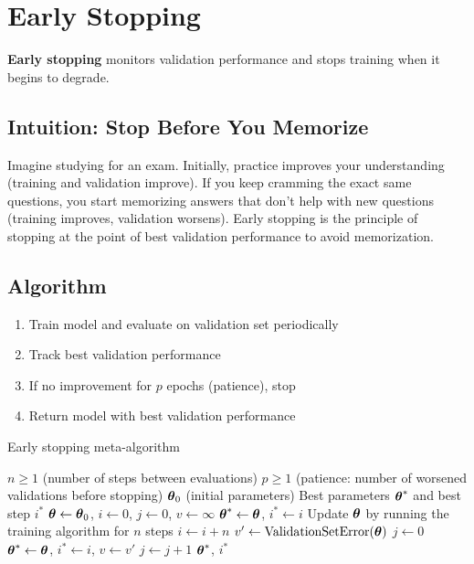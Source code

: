 
\section{Early Stopping }
\label{sec:early-stopping}

\textbf{Early stopping} monitors validation performance and stops training when it begins to degrade.

\subsection{Intuition: Stop Before You Memorize}

Imagine studying for an exam. Initially, practice improves your understanding (training and validation improve). If you keep cramming the exact same questions, you start memorizing answers that don't help with new questions (training improves, validation worsens). Early stopping is the principle of stopping at the point of best validation performance to avoid memorization.

\subsection{Algorithm}

\begin{enumerate}
    \item Train model and evaluate on validation set periodically
    \item Track best validation performance
    \item If no improvement for $p$ epochs (patience), stop
    \item Return model with best validation performance
\end{enumerate}

\begin{algorithm}
\caption{Early stopping meta-algorithm}
\label{alg:early-stopping}
\begin{algorithmic}
\Require $n \geq 1$ (number of steps between evaluations)
\Require $p \geq 1$ (patience: number of worsened validations before stopping)
\Require $\boldsymbol{\theta}_0$ (initial parameters)
\Ensure Best parameters $\boldsymbol{\theta}^*$ and best step $i^*$
\State $\boldsymbol{\theta} \gets \boldsymbol{\theta}_0$, $i \gets 0$, $j \gets 0$, $v \gets \infty$
\State $\boldsymbol{\theta}^* \gets \boldsymbol{\theta}$, $i^* \gets i$
    \State Update $\boldsymbol{\theta}$ by running the training algorithm for $n$ steps
    \State $i \gets i + n$
    \State $v' \gets \text{ValidationSetError}(\boldsymbol{\theta})$
        \State $j \gets 0$
        \State $\boldsymbol{\theta}^* \gets \boldsymbol{\theta}$, $i^* \gets i$, $v \gets v'$
    \Else
        \State $j \gets j + 1$
    \EndIf
\EndWhile
\State \Return $\boldsymbol{\theta}^*$, $i^*$
\end{algorithmic}
\end{algorithm}

